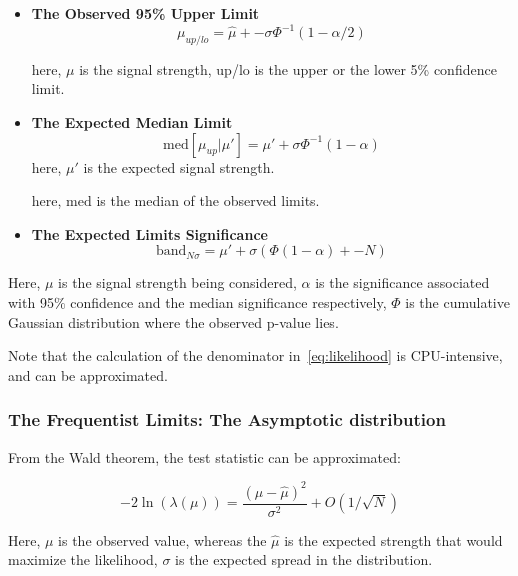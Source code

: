 \begin{itemize}


\item \textbf{The Observed 95\% Upper Limit}
\begin{equation}
\mu_{up/lo} = \hat{\mu} +- \sigma\Phi^{-1}(1-\alpha/2)
\end{equation}

here, $\mu$ is the signal strength, up/lo is the upper or the lower 5\% confidence limit. 

\item \textbf{The Expected Median Limit}
\begin{equation}
    \mathrm{med}[\mu_{up}|\mu'] = \mu' + \sigma\Phi^{-1}(1-\alpha) 
\end{equation}
here, $\mu'$ is the expected signal strength.


here, $\mathrm{med}$ is the  median of the observed limits.

\item \textbf{The Expected Limits Significance}
\begin{equation}
    \mathrm{band}_{N\sigma} = \mu' + \sigma(\Phi(1-\alpha)+-N)
\end{equation}

\end{itemize}


Here, $\mu$ is the signal strength being considered, $\alpha$ is the significance associated with 95$\%$ confidence and the median significance respectively, $\Phi$ is the cumulative Gaussian distribution where the observed p-value lies.

Note that the calculation of the denominator in~\ref{eq:likelihood} is CPU-intensive, and can be approximated.


\subsubsection{The Frequentist Limits: The Asymptotic distribution}
\label{sec:asymp}


From the Wald theorem, the test statistic can be approximated: 

\begin{equation}
-2\ln(\lambda(\mu))= \frac{(\mu- \hat{\mu})^{2}}{\sigma^{2}} +O(1/\sqrt{N})
\label{eq:wald}
\end{equation}

Here, $\mu$ is the observed value, whereas the $\hat{\mu}$ is the expected strength that would maximize the likelihood, $\sigma$ is the expected spread in the distribution. 

